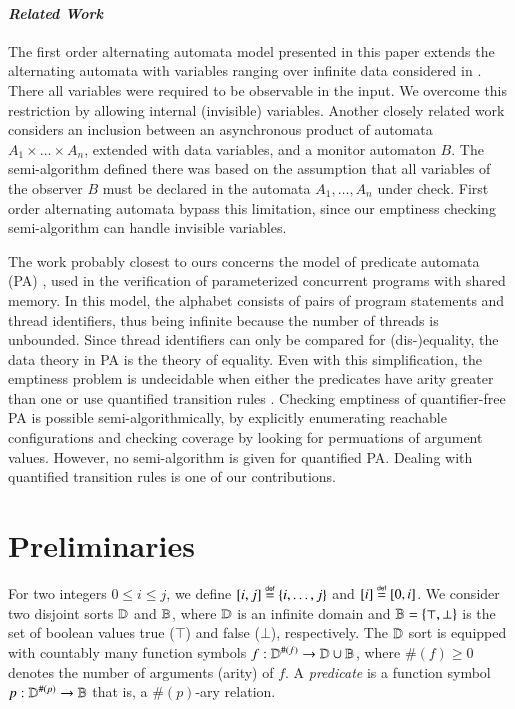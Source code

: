 \paragraph{\em Related Work} 
The first order alternating automata model presented in this paper
extends the alternating automata with variables ranging over infinite
data considered in \cite{IosifXu18}. There all variables were required
to be observable in the input. We overcome this restriction by
allowing internal (invisible) variables. Another closely related work
\cite{IosifRV16} considers an inclusion between an asynchronous
product of automata $A_1 \times \ldots \times A_n$, extended with data
variables, and a monitor automaton $B$. The semi-algorithm defined
there was based on the assumption that all variables of the observer
$B$ must be declared in the automata $A_1, \ldots, A_n$ under
check. First order alternating automata bypass this limitation, since
our emptiness checking semi-algorithm can handle invisible variables.

The work probably closest to ours concerns the model of predicate
automata (PA) \cite{Farzan15,Farzan16,KincaidPhD}, used in the
verification of parameterized concurrent programs with shared
memory. In this model, the alphabet consists of pairs of program
statements and thread identifiers, thus being infinite because the
number of threads is unbounded. Since thread identifiers can only be
compared for (dis-)equality, the data theory in PA is the theory of
equality. Even with this simplification, the emptiness problem is
undecidable when either the predicates have arity greater than one
\cite{Farzan15} or use quantified transition rules
\cite{KincaidPhD}. Checking emptiness of quantifier-free PA is
possible semi-algorithmically, by explicitly enumerating reachable
configurations and checking coverage by looking for permuations of
argument values. However, no semi-algorithm is given for quantified
PA.  Dealing with quantified transition rules is one of our
contributions.

\section{Preliminaries}

For two integers $0 \leq i \leq j$, we define $[i,j] \stackrel{\scriptscriptstyle{\mathsf{def}}}{=}
\{ i,\ldots,j \}$ and $[i] \stackrel{\scriptscriptstyle{\mathsf{def}}}{=} [0,i]$. We consider two disjoint
sorts $\mathbb{D}$ and $\mathbb{B}$, where $\mathbb{D}$ is an infinite domain and
$\mathbb{B} = \{ \top,\bot \}$ is the set of boolean values true ($\top$)
and false ($\bot$), respectively. The $\mathbb{D}$ sort is equipped with
countably many function symbols $f : \mathbb{D}^{\#(f)} \rightarrow \mathbb{D}
\cup \mathbb{B}$, where $\#(f)\geq0$ denotes the number of arguments
(arity) of $f$. A \emph{predicate} is a function symbol $p :
\mathbb{D}^{\#(p)} \rightarrow \mathbb{B}$ that is, a $\#(p)$-ary relation.

